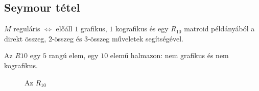 \subsection{Seymour tétel}

$M$ reguláris $\Leftrightarrow$  előáll $1$ grafikus, $1$ kografikus és egy
$R_{10}$ matroid példányából a direkt összeg, $2$-összeg és $3$-összeg műveletek
segítségével.

Az $R10$ egy $5$ rangú elem, egy $10$ elemű halmazon: nem grafikus és nem
kografikus.

\begin{figure}[htb]
\caption{Az $R_{10}$}
\label{fig:Seymour}
\centering {}
\end{figure}
